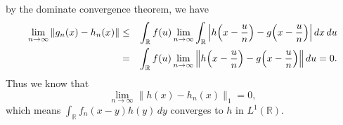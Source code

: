 \documentclass[12pt,a4paper]{ctexart}
\begin{document}
by the dominate convergence theorem, we have
\begin{eqnarray*}
    \lim_{n\to \infty} \|g_{n}(x) - h_{n}(x)\| & \leq & \int_{\mathbb{R}}^{} f (u) \lim_{n\to \infty}  \int_{\mathbb{R}}^{}  \Big{|} h \Big{(} x - \frac{u}{n} \Big{)} - g \Big{(} x - \frac{u}{n} \Big{)} \Big{|} \, d x \, d u \\ & = & \int_{\mathbb{R}}^{} f (u) \lim_{n\to \infty}  \Big{\|} h \Big{(} x - \frac{u}{n} \Big{)} - g \Big{(} x - \frac{u}{n} \Big{)} \Big{\|} \, d u = 0.
\end{eqnarray*}
Thus we know that
\begin{equation*}
    \lim_{n \to \infty} \|h(x) - h_{n}(x)\|_{1} = 0,
\end{equation*}
which means $\int_{\mathbb{R}}^{} f_{n} (x - y) h(y) \, d y$ converges to $h$ in $L^{1}(\mathbb{R})$.
\end{document}
